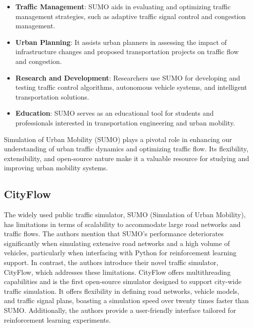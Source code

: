 \begin{itemize}
    \item \textbf{Traffic Management}: SUMO aids in evaluating and optimizing traffic management strategies, such as adaptive traffic signal control and congestion management.
    
    \item \textbf{Urban Planning}: It assists urban planners in assessing the impact of infrastructure changes and proposed transportation projects on traffic flow and congestion.
    
    \item \textbf{Research and Development}: Researchers use SUMO for developing and testing traffic control algorithms, autonomous vehicle systems, and intelligent transportation solutions.
    
    \item \textbf{Education}: SUMO serves as an educational tool for students and professionals interested in transportation engineering and urban mobility.
\end{itemize}

Simulation of Urban Mobility (SUMO)\cite{SUMO2018} plays a pivotal role in enhancing our understanding of urban traffic dynamics and optimizing traffic flow. Its flexibility, extensibility, and open-source nature make it a valuable resource for studying and improving urban mobility systems.


\subsection{CityFlow}
The widely used public traffic simulator, SUMO (Simulation of Urban Mobility)\cite{SUMO2018}, has limitations in terms of scalability to accommodate large road networks and traffic flows. The authors mention that SUMO's performance deteriorates significantly when simulating extensive road networks and a high volume of vehicles, particularly when interfacing with Python for reinforcement learning support. In contrast, the authors introduce their novel traffic simulator, CityFlow\cite{zhang2019cityflow}, which addresses these limitations. CityFlow offers multithreading capabilities and is the first open-source simulator designed to support city-wide traffic simulation. It offers flexibility in defining road networks, vehicle models, and traffic signal plans, boasting a simulation speed over twenty times faster than SUMO. Additionally, the authors provide a user-friendly interface tailored for reinforcement learning experiments.

